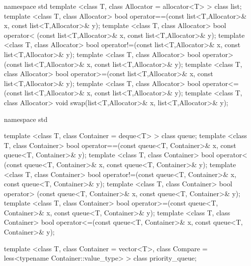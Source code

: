 %

\begin{codeblock}
namespace std {
  template <class T, class Allocator = allocator<T> > class list;
  template <class T, class Allocator>
    bool operator==(const list<T,Allocator>& x, const list<T,Allocator>& y);
  template <class T, class Allocator>
    bool operator< (const list<T,Allocator>& x, const list<T,Allocator>& y);
  template <class T, class Allocator>
    bool operator!=(const list<T,Allocator>& x, const list<T,Allocator>& y);
  template <class T, class Allocator>
    bool operator> (const list<T,Allocator>& x, const list<T,Allocator>& y);
  template <class T, class Allocator>
    bool operator>=(const list<T,Allocator>& x, const list<T,Allocator>& y);
  template <class T, class Allocator>
    bool operator<=(const list<T,Allocator>& x, const list<T,Allocator>& y);
  template <class T, class Allocator>
    void swap(list<T,Allocator>& x, list<T,Allocator>& y);
}
\end{codeblock}

%

\begin{codeblock}
namespace std {
  template <class T, class Container = deque<T> > class queue;
  template <class T, class Container>
    bool operator==(const queue<T, Container>& x,
                    const queue<T, Container>& y);
  template <class T, class Container>
    bool operator< (const queue<T, Container>& x,
                    const queue<T, Container>& y);
  template <class T, class Container>
    bool operator!=(const queue<T, Container>& x,
                    const queue<T, Container>& y);
  template <class T, class Container>
    bool operator> (const queue<T, Container>& x,
                    const queue<T, Container>& y);
  template <class T, class Container>
    bool operator>=(const queue<T, Container>& x,
                    const queue<T, Container>& y);
  template <class T, class Container>
    bool operator<=(const queue<T, Container>& x,
                    const queue<T, Container>& y);

  template <class T, class Container = vector<T>,
            class Compare = less<typename Container::value_type> >
  class priority_queue;
}
\end{codeblock}

%


